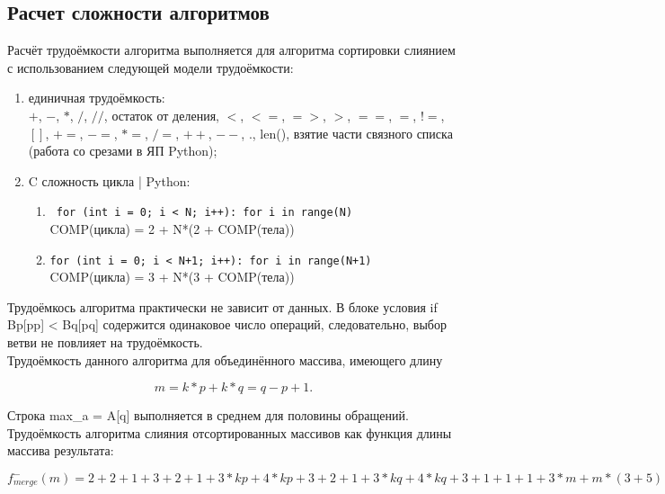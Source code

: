 \documentclass[12pt,a4paper]{scrartcl}
\begin{document}
	\subsection{Расчет сложности алгоритмов}
	
		Расчёт трудоёмкости алгоритма выполняется для алгоритма сортировки слиянием с использованием следующей модели трудоёмкости:
		
		\begin{enumerate}
			
			\item единичная трудоёмкость: \\
			$+$, $-$, $*$, $/$, $//$, остаток от деления, $<$, $<=$, $=>$, $>$, $==$, $=$, $!=$, $[]$, $+=$, $-=$, $*=$, $/=$, $++$, $--$, $.$, len(), взятие части связного списка (работа со срезами в ЯП Python);
			
			\item C сложность цикла | Python:
			\begin{enumerate}
				
				\item \lstinline| for (int i = 0; i < N; i++): for i in range(N) | \\ 
				COMP(цикла) = 2 + N*(2 + COMP(тела))
				
				\item \lstinline|for (int i = 0; i < N+1; i++): for i in range(N+1)| \\
				COMP(цикла) = 3 + N*(3 + COMP(тела)) 
				
			\end{enumerate}

			
		\end{enumerate}
	
		Трудоёмкось алгоритма практически не зависит от данных. В блоке условия if Bp[pp] < Bq[pq] содержится одинаковое число операций, следовательно, выбор ветви не повлияет на трудоёмкость. \\

		Трудоёмкость данного алгоритма для объединённого массива, имеющего длину 
		
		\begin{equation*}
			 m = k*p + k*q = q - p + 1.
		\end{equation*}
		
		Строка max\_a = A[q] выполняется в среднем для половины обращений.
		Трудоёмкость алгоритма слияния отсортированных массивов как функция длины массива результата:
		
		\begin{equation}	
			\label{eq2.1}
			f_{merge}^-(m) = 2 + 2 + 1 + 3 + 2 + 1 + 3*kp + 4*kp + 3 + 2 + 1 + 3*kq + 4*kq + 3 + 1 + 1 + 1 + 3*m + m*(3 + 5)
		\end{equation}
		
\end{document}
